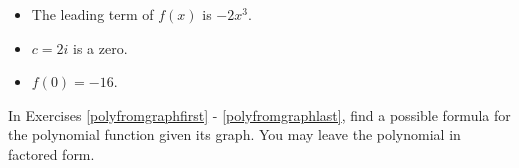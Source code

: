 \begin{exenum}
\begin{itemize}
\end{itemize}

\item \label{buildcompolylast}

\begin{itemize}

\item The leading term of $f(x)$ is $-2x^3$.
\item $c=2i$ is a zero.
\item $f(0) = -16$.

\end{itemize}

\end{exenum}

In Exercises \ref{polyfromgraphfirst} - \ref{polyfromgraphlast}, find a possible formula for the polynomial function given its graph.  You may leave the polynomial in factored form. 

